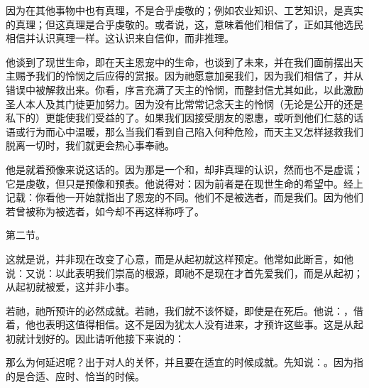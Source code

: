 因为在其他事物中也有真理，不是合乎虔敬的；例如农业知识、工艺知识，是真实的真理；但这真理是合乎虔敬的。或者说，这，意味着他们相信了，正如其他选民相信并认识真理一样。这认识来自信仰，而非推理。\par

他谈到了现世生命，即在天主恩宠中的生命，也谈到了未来，并在我们面前摆出天主赐予我们的怜悯之后应得的赏报。因为祂愿意加冕我们，因为我们相信了，并从错误中被解救出来。你看，序言充满了天主的怜悯，而整封信尤其如此，以此激励圣人本人及其门徒更加努力。因为没有比常常记念天主的怜悯（无论是公开的还是私下的）更能使我们受益的了。如果我们因接受朋友的恩惠，或听到他们仁慈的话语或行为而心中温暖，那么当我们看到自己陷入何种危险，而天主又怎样拯救我们脱离一切时，我们就更会热心事奉祂。\par

他是就着预像来说这话的。因为那是一个和，却非真理的认识，然而也不是虚谎；它是虔敬，但只是预像和预表。他说得对：因为前者是在现世生命的希望中。经上记载：你看他一开始就指出了恩宠的不同。他们不是被选者，而是我们。因为他们若曾被称为被选者，如今却不再这样称呼了。\par

第二节。\par

这就是说，并非现在改变了心意，而是从起初就这样预定。他常如此断言，如他说：又说：以此表明我们崇高的根源，即祂不是现在才首先爱我们，而是从起初；从起初就被爱，这并非小事。\par

若祂，祂所预许的必然成就。若祂，我们就不该怀疑，即使是在死后。他说：，借着，他也表明这值得相信。这不是因为犹太人没有进来，才预许这些事。这是从起初就计划好的。因此请听他接下来说的：\par

\par

那么为何延迟呢？出于对人的关怀，并且要在适宜的时候成就。先知说：。因为指的是合适、应时、恰当的时候。\par

